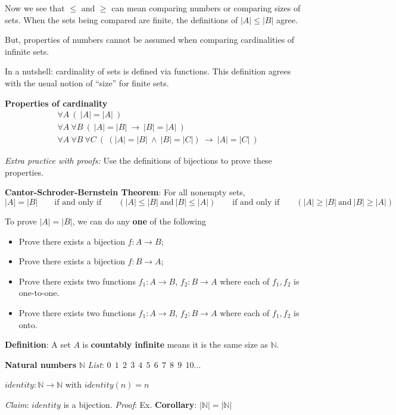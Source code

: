 \documentclass[12pt, oneside]{article}
\begin{document}
Now we see that $\leq$ and $\geq$ can mean comparing
numbers or comparing sizes of sets. When the sets being 
compared are finite, the definitions 
of $|A| \leq |B|$ agree. 

But, properties of numbers cannot be assumed when comparing
cardinalities of infinite sets.

In a nutshell: cardinality of sets is defined via functions.
This definition agrees with the usual notion of ``size'' for 
finite sets. 

{\bf Properties of cardinality}
\begin{align*}
&\forall A ~ (~  |A| = |A| ~)\\
&\forall A ~ \forall B ~(~ |A| = |B|  ~\to ~ |B| = |A|~)\\
&\forall A ~ \forall B ~ \forall C~ (~ (|A| = |B| ~\wedge~ |B| = |C|) ~\to ~ |A| = |C|~)
\end{align*}

{\it Extra practice with proofs:} Use the definitions of bijections to prove these properties. 

{\bf Cantor-Schroder-Bernstein Theorem}: For all nonempty sets,
\[
|A| = |B| \qquad\text{if and only if} \qquad (|A| \leq |B| ~\text{and}~ |B| \leq |A|)
\qquad\text{if and only if} \qquad (|A| \geq |B| ~\text{and}~ |B| \geq |A|)
\]

To prove $|A| = |B|$,  we can do any {\bf one} of the following

\begin{itemize}\setlength{\itemsep}{-5pt}
\item Prove there exists  a bijection $f:  A \to B$;
\item Prove there exists a  bijection  $f: B  \to  A$;
\item Prove there exists two functions $f_1: A \to B$, $f_2: B \to  A$ where each of $f_1, f_2$ is one-to-one.
\item Prove there exists two functions $f_1: A \to B$, $f_2: B \to  A$ where each of $f_1, f_2$ is onto.
\end{itemize} \newpage


{\bf Definition}: A set $A$ is {\bf countably infinite} means it is the 
same size as $\mathbb{N}$.

 

{\bf Natural numbers} $\mathbb{N}$ \hfill {\it List}:  $0~~1~~2~~3~~4~~5~~6~~7~~8~~9~~10 \ldots$

$identity: \mathbb{N} \to \mathbb{N}$ with $identity(n) = n$

{\it Claim}: $identity$ is a bijection. {\it Proof}: Ex. \hfill {\bf Corollary}: $ | \mathbb{N} | = |\mathbb{N}|~$
\end{document}
